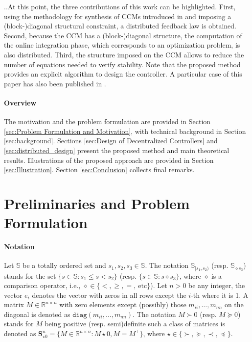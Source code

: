 \documentclass[10pt,twocolumn,twoside]{IEEEtran}
\newcounter{para}
\newcommand\mypara{\par \thesection.\refstepcounter{para}\thepara.\space}
\theoremstyle{plain}
\theoremstyle{definition}
\theoremstyle{remark}
\begin{document}


\mypara At this point, the three contributions of this work can be highlighted. First, using the methodology for synthesis of CCMs introduced in \cite{manchester_control_2017} and imposing a (block-)diagonal structural constraint, a distributed feedback law is obtained. Second, because the CCM has a (block-)diagonal structure, the computation of the online integration phase, which corresponds to an optimization problem, is also distributed. Third, the structure imposed on the CCM allows to reduce the number of equations needed to  verify stability. Note that the proposed method provides an explicit algorithm to design the controller. A particular case of this paper has also been published in \cite{SteinShiromotoManchester2016}.

\paragraph{Overview} The motivation and the problem formulation are provided in Section \ref{sec:Problem Formulation and Motivation}, with technical background in Section \ref{sec:background}. Sections \ref{sec:Design of Decentralized Controllers} and \ref{sec:distributed_design} present the proposed method and main theoretical results. Illustrations of the proposed approach are provided in Section \ref{sec:Illustration}. Section \ref{sec:Conclusion} collects final remarks.

\section{Preliminaries and Problem Formulation}

\paragraph{Notation} Let $\mathbb{S}$ be a totally ordered set and $s_1,s_2,s_3\in\mathbb{S}$. The notation $\mathbb{S}_{[s_1,s_2)}$ (resp. $\mathbb{S}_{\diamond s_3}$) stands for the set $\{s\in\mathbb{S}:s_1\leq s< s_2\}$ (resp. $\{s\in\mathbb{S}:s\diamond s_3\}$, where $\diamond$ is a comparison operator, i.e., $\diamond\in\{<,\geq,=,\ \text{etc}\}$). Let $n>0$ be any integer, the vector $e_i$ denotes the vector with zeros in all rows except the $i$-th where it is 1. A matrix $M\in\mathbb{R}^{n\times n}$ with zero elements except (possibly) those  $m_{ii},\ldots,m_{nn}$ on the diagonal is denoted as $\mathbin{\mathtt{diag}}(m_{ii},\ldots,m_{nn})$. The notation $M\succ 0$ (resp. $M\succeq 0$) stands for $M$ being positive (resp. semi)definite such a class of matrices is denoted as $\mathbf{S}_{\star0}^n=\{M\in\mathbb{R}^{n\times n}:M\star0,M=M^\top\}$, where $\star\in\{\succ,\succeq,\prec,\preceq\}$. 
\end{document}
